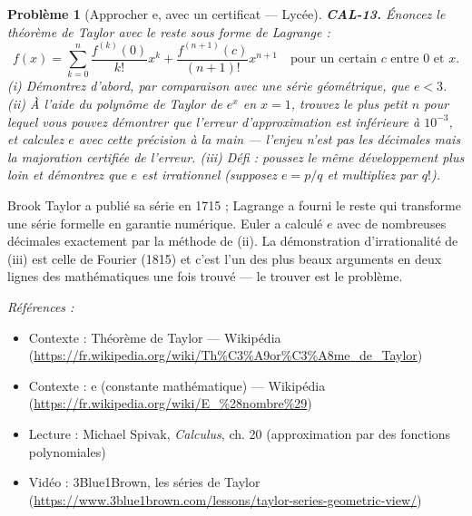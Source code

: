 \documentclass[11pt]{article}
\newtheorem{problem}{Problème}
\newenvironment{refs}{\par\small\noindent\emph{Références :}\begin{itemize}\setlength\itemsep{0pt}}{\end{itemize}\normalsize}
\begin{document}
\begin{problem}[{Approcher e, avec un certificat --- Lycée}]
\textbf{CAL-13.} Énoncez le théorème de Taylor avec le reste sous forme de
Lagrange :
\[ f(x) = \sum_{k=0}^{n} \frac{f^{(k)}(0)}{k!}x^k + \frac{f^{(n+1)}(c)}{(n+1)!}x^{n+1}
\quad\text{pour un certain } c \text{ entre } 0 \text{ et } x. \]
(i) Démontrez d'abord, par comparaison avec une série géométrique, que $ e < 3 $. (ii) À l'aide
du polynôme de Taylor de $ e^x $ en $ x=1 $, trouvez le plus petit $ n $ pour lequel vous
pouvez \textit{démontrer} que l'erreur d'approximation est inférieure à $ 10^{-3} $, et calculez $ e $ avec
cette précision à la main --- l'enjeu n'est pas les décimales mais la majoration certifiée de l'erreur.
(iii) Défi : poussez le même développement plus loin et démontrez que $ e $ est irrationnel
(supposez $ e = p/q $ et multipliez par $ q! $).
\end{problem}

\noindent Brook Taylor a publié sa série en 1715 ; Lagrange a fourni le
reste qui transforme une série formelle en garantie numérique. Euler a calculé $ e $ avec
de nombreuses décimales exactement par la méthode de (ii). La démonstration d'irrationalité de (iii) est celle de Fourier
(1815) et c'est l'un des plus beaux arguments en deux lignes des mathématiques une fois trouvé ---
le trouver est le problème.

\begin{refs}
\item Contexte : Théorème de Taylor --- Wikipédia (\url{https://fr.wikipedia.org/wiki/Th%C3%A9or%C3%A8me_de_Taylor})
\item Contexte : e (constante mathématique) --- Wikipédia (\url{https://fr.wikipedia.org/wiki/E_%28nombre%29})
\item Lecture : Michael Spivak, \textit{Calculus}, ch. 20 (approximation par des fonctions polynomiales)
\item Vidéo : 3Blue1Brown, les séries de Taylor (\url{https://www.3blue1brown.com/lessons/taylor-series-geometric-view/})
\end{refs}

\bigskip
\end{document}
